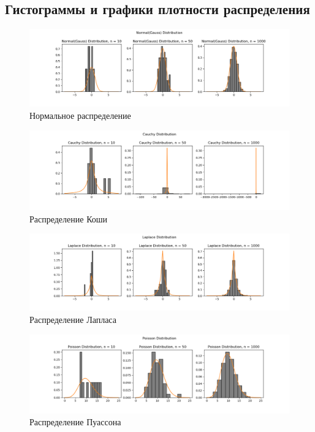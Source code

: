 \documentclass[../body.tex]{subfiles}
\begin{document}
	\subsection{Гистограммы и графики плотности распределения}
	\begin{figure}[H]
		\centering
		\includegraphics[width=\textwidth, height =0.25\textheight]{img/Normal.png}
		\caption{Нормальное распределение}
		\label{fig:normal}
	\end{figure}

	\begin{figure}[H]
		\centering
		\includegraphics[width=\textwidth, height =0.25\textheight]{img/Cauchy.png}
		\caption{Распределение Коши}
		\label{fig:cauchy}
	\end{figure}
	

	\begin{figure}[H]
		\centering
		\includegraphics[width=\textwidth, height =0.25\textheight]{img/Laplace.png}
		\caption{Распределение Лапласа}
		\label{fig:laplace}
	\end{figure}


	\begin{figure}[H]
		\centering
		\includegraphics[width=\textwidth, height =0.25\textheight]{img/Poisson.png}
		\caption{Распределение Пуассона}
		\label{fig:poisson}
	\end{figure}
\end{document}
